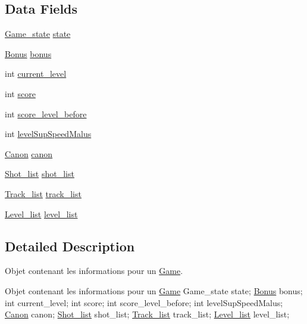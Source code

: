\subsection*{Data Fields}
\begin{DoxyCompactItemize}
\item 
\hyperlink{game_8h_a33e243da48884e73997b5c5fa62864d4}{Game\+\_\+state} \hyperlink{struct_game_abe9c6b7e729dc8fdac044b9a37ec19f3}{state}
\item 
\hyperlink{struct_bonus}{Bonus} \hyperlink{struct_game_ad9bc80a3bd450dcd9f2c68c2e523051d}{bonus}
\item 
int \hyperlink{struct_game_aadd67ce7858be05c138c310167fcf663}{current\+\_\+level}
\item 
int \hyperlink{struct_game_aef160b7437d94056f1dc59646cd5b87d}{score}
\item 
int \hyperlink{struct_game_aa59e6d9166b7c819a741e5738d7edb4a}{score\+\_\+level\+\_\+before}
\item 
int \hyperlink{struct_game_a740c72199e905a6e7b1465e539ce9405}{level\+Sup\+Speed\+Malus}
\item 
\hyperlink{struct_canon}{Canon} \hyperlink{struct_game_a842d6f5ebfe8dd375e5b03e080622d93}{canon}
\item 
\hyperlink{struct_shot__list}{Shot\+\_\+list} \hyperlink{struct_game_ad9d344b557c1fa1dcf5707e3009feb07}{shot\+\_\+list}
\item 
\hyperlink{struct_track__list}{Track\+\_\+list} \hyperlink{struct_game_a3a80b48316d096cc230b63eb95214c36}{track\+\_\+list}
\item 
\hyperlink{struct_level__list}{Level\+\_\+list} \hyperlink{struct_game_a592a02fc63fe476f0b4fabe6240a24b8}{level\+\_\+list}
\end{DoxyCompactItemize}


\subsection{Detailed Description}
Objet contenant les informations pour un \hyperlink{struct_game}{Game}. 

Objet contenant les informations pour un \hyperlink{struct_game}{Game} Game\+\_\+state state; \hyperlink{struct_bonus}{Bonus} bonus; int current\+\_\+level; int score; int score\+\_\+level\+\_\+before; int level\+Sup\+Speed\+Malus; \hyperlink{struct_canon}{Canon} canon; \hyperlink{struct_shot__list}{Shot\+\_\+list} shot\+\_\+list; \hyperlink{struct_track__list}{Track\+\_\+list} track\+\_\+list; \hyperlink{struct_level__list}{Level\+\_\+list} level\+\_\+list; 

